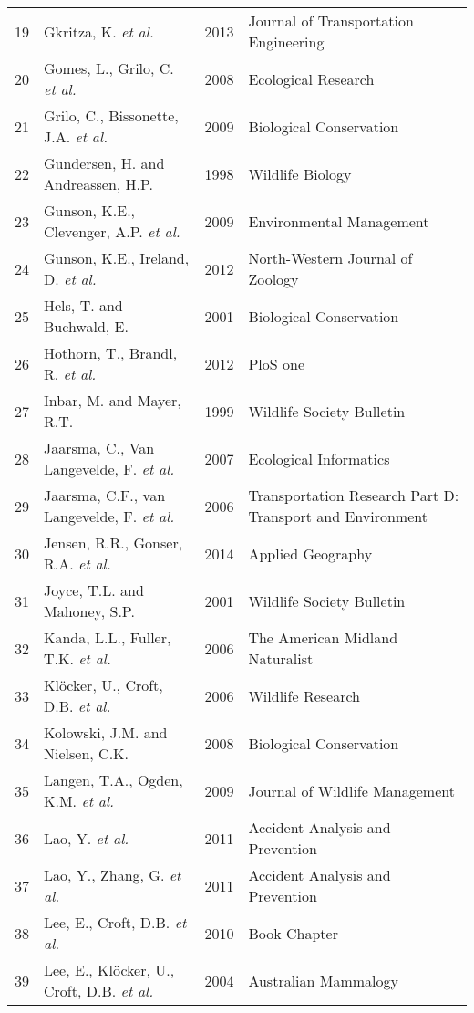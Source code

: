 \begin{longtable}[c]{@{}p{.75cm}p{6cm}p{1.25cm}p{5.5cm}@{}}
   19 & Gkritza, K. \textit{et al.} & 2013 & Journal of Transportation Engineering \\ 
   20 & Gomes, L., Grilo, C. \textit{et al.} & 2008 & Ecological Research \\ 
   21 & Grilo, C., Bissonette, J.A. \textit{et al.} & 2009 & Biological Conservation \\ 
   22 & Gundersen, H. and Andreassen, H.P. & 1998 & Wildlife Biology \\ 
   23 & Gunson, K.E., Clevenger, A.P. \textit{et al.} & 2009 & Environmental Management \\ 
   24 & Gunson, K.E., Ireland, D. \textit{et al.} & 2012 & North-Western Journal of Zoology \\ 
   25 & Hels, T. and Buchwald, E. & 2001 & Biological Conservation \\ 
   26 & Hothorn, T., Brandl, R. \textit{et al.} & 2012 & PloS one \\ 
   27 & Inbar, M. and Mayer, R.T. & 1999 & Wildlife Society Bulletin \\ 
   28 & Jaarsma, C., Van Langevelde, F. \textit{et al.} & 2007 & Ecological Informatics \\ 
   29 & Jaarsma, C.F., van Langevelde, F. \textit{et al.} & 2006 & Transportation Research Part D: Transport and Environment  \\ 
   30 & Jensen, R.R., Gonser, R.A. \textit{et al.} & 2014 & Applied Geography \\ 
   31 & Joyce, T.L. and Mahoney, S.P. & 2001 & Wildlife Society Bulletin \\ 
   32 & Kanda, L.L., Fuller, T.K. \textit{et al.} & 2006 & The American Midland Naturalist \\ 
   33 & Klöcker, U., Croft, D.B. \textit{et al.} & 2006 & Wildlife Research \\ 
   34 & Kolowski, J.M. and Nielsen, C.K. & 2008 & Biological Conservation  \\ 
   35 & Langen, T.A., Ogden, K.M. \textit{et al.} & 2009 & Journal of Wildlife Management \\ 
   36 & Lao, Y. \textit{et al.} & 2011 & Accident Analysis and Prevention \\ 
   37 & Lao, Y., Zhang, G. \textit{et al.} & 2011 & Accident Analysis and Prevention \\ 
   38 & Lee, E., Croft, D.B. \textit{et al.} & 2010 & Book Chapter \\ 
   39 & Lee, E., Klöcker, U., Croft, D.B. \textit{et al.} & 2004 & Australian Mammalogy \\ 

\end{longtable}
